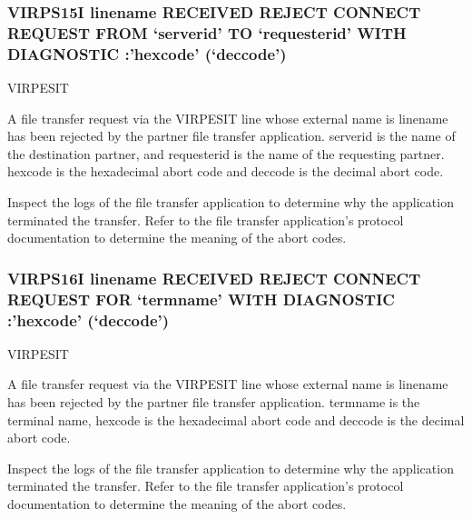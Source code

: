 \documentclass[letterpaper,10pt,english]{sphinxmanual}
\begin{document}
\subsubsection{VIRPS15I linename RECEIVED REJECT CONNECT REQUEST FROM ‘serverid’ TO ‘requesterid’ WITH DIAGNOSTIC :’hexcode’ (‘deccode’)}
\label{\detokenize{messages:virps15i-linename-received-reject-connect-request-from-serverid-to-requesterid-with-diagnostic-hexcode-deccode}}\begin{description}
\sphinxAtStartPar
VIRPESIT

\sphinxAtStartPar
A file transfer request via the VIRPESIT line whose external name is linename has been rejected by the partner file transfer application. serverid is the name of the destination partner, and requesterid is the name of the requesting partner. hexcode is the hexadecimal abort code and deccode is the decimal abort code.

\sphinxAtStartPar
Inspect the logs of the file transfer application to determine why the application terminated the transfer. Refer to the file transfer application’s protocol documentation to determine the meaning of the abort codes.

\end{description}


\subsubsection{VIRPS16I linename RECEIVED REJECT CONNECT REQUEST FOR ‘termname’ WITH DIAGNOSTIC :’hexcode’ (‘deccode’)}
\label{\detokenize{messages:virps16i-linename-received-reject-connect-request-for-termname-with-diagnostic-hexcode-deccode}}\begin{description}
\sphinxAtStartPar
VIRPESIT

\sphinxAtStartPar
A file transfer request via the VIRPESIT line whose external name is linename has been rejected by the partner file transfer application. termname is the terminal name, hexcode is the hexadecimal abort code and deccode is the decimal abort code.

\sphinxAtStartPar
Inspect the logs of the file transfer application to determine why the application terminated the transfer. Refer to the file transfer application’s protocol documentation to determine the meaning of the abort codes.

\end{description}
\end{document}
